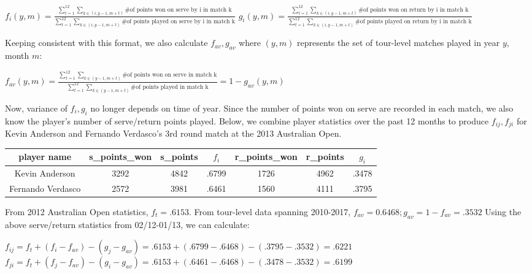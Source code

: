 \documentclass[chapterprefix=false]{report}
\begin{document}
\begin{center}
$f_i(y,m) = \frac{\sum_{t=1}^{12}\sum_{k \in (i,y-1,m+t)}{\text{\# of points won on serve by i in match k}}}{\sum_{t=1}^{12}\sum_{k \in (i,y-1,m+t)}\text{\# of points played on serve by i in match k}}$
$g_i(y,m) = \frac{\sum_{t=1}^{12}\sum_{k \in (i,y-1,m+t)}{\text{\# of points won on return by i in match k}}}{\sum_{t=1}^{12}\sum_{k \in (i,y-1,m+t)}\text{\# of points played on return by i in match k}}$
\end{center}

Keeping consistent with this format, we also calculate $f_{av},g_{av}$ where $(y,m)$ represents the set of tour-level matches played in year $y$, month $m$:

\begin{center}
$f_{av}(y,m) = \frac{\sum_{t=1}^{12}\sum_{k \in (y-1,m+t)}{\text{\# of points won on serve in match k}}}{\sum_{t=1}^{12}\sum_{k \in (y-1,m+t)}\text{\# of points played in match k}} = 1 - g_{av}(y,m)$
\end{center}

Now, variance of $f_i,g_i$ no longer depends on time of year. Since the number of points won on serve are recorded in each match, we also know the player's number of serve/return points played. Below, we combine player statistics over the past 12 months to produce $f_{ij},f_{ji}$ for Kevin Anderson and Fernando Verdasco's 3rd round match at the 2013 Australian Open.

\begin{center}
\begin{tabular}{ |c|c|c|c|c|c|c| } 
 \hline
 player name & s\_points\_won & s\_points
&$f_i$ & r\_points\_won & r\_points & $g_i$ \\ 
 \hline
 Kevin Anderson & 3292 & 4842 & .6799 & 1726 & 4962 & .3478\\ 
 \hline
 Fernando Verdasco & 2572 & 3981 & .6461 & 1560 & 4111 & .3795\\ 
 \hline
\end{tabular}
\end{center}

From 2012 Australian Open statistics, $f_t=.6153$. From tour-level data spanning 2010-2017, $f_{av} = 0.6468; g_{av} = 1-f_{av} =.3532$ Using the above serve/return statistics from 02/12-01/13, we can calculate:

\begin{center}
$f_{ij} = f_t + (f_i-f_{av})-(g_j-g_{av}) = .6153 + (.6799-.6468) - (.3795-.3532) = .6221$
$f_{ji} = f_t + (f_j-f_{av})-(g_i-g_{av}) = .6153 + (.6461-.6468) - (.3478-.3532) = .6199$
\end{center}
\end{document}
